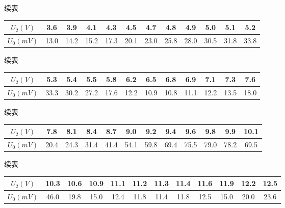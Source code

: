 \documentclass{article}
\begin{document}
    续表

    \begin{center}
        \begin{tabular}{|c|c|c|c|c|c|c|c|c|c|c|c|}
            \hline
            $U_2(V)$ & 3.6   & 3.9   & 4.1   & 4.3   & 4.5   & 4.7   & 4.8   & 4.9   & 5.0   & 5.1   & 5.2 \\
            \hline
            $U_0(mV)$ & 13.0  & 14.2  & 15.2  & 17.3  & 20.1  & 23.0  & 25.8  & 28.0  & 30.5  & 31.8  & 33.8 \\
            \hline
        \end{tabular}%
    \end{center}

    续表

    \begin{center}
        \begin{tabular}{|c|c|c|c|c|c|c|c|c|c|c|c|}
            \hline
            $U_2(V)$ & 5.3   & 5.4   & 5.5   & 5.8   & 6.2   & 6.5   & 6.8   & 6.9   & 7.1   & 7.3   & 7.6 \\
            \hline
            $U_0(mV)$ & 33.3  & 30.2  & 27.2  & 17.6  & 12.2  & 10.9  & 10.8  & 11.1  & 12.2  & 13.5  & 18.0 \\
            \hline
        \end{tabular}%
    \end{center}

    续表

    \begin{center}
        \begin{tabular}{|c|c|c|c|c|c|c|c|c|c|c|c|}
            \hline
            $U_2(V)$ & 7.8   & 8.1   & 8.4   & 8.7   & 9.0   & 9.2   & 9.4   & 9.6   & 9.8   & 9.9   & 10.1 \\
            \hline
            $U_0(mV)$ & 20.4  & 24.3  & 31.4  & 41.4  & 54.1  & 59.8  & 69.4  & 75.5  & 79.0  & 78.2  & 69.5 \\
            \hline
        \end{tabular}%
    \end{center}

    续表

    \begin{center}
        \begin{tabular}{|c|c|c|c|c|c|c|c|c|c|c|c|}
            \hline
            $U_2(V)$ & 10.3  & 10.6  & 10.9  & 11.1  & 11.2  & 11.3  & 11.4  & 11.6  & 11.9  & 12.2  & 12.5  \bigstrut\\
            \hline
            $U_0(mV)$ & 46.0  & 19.8  & 15.0  & 12.4  & 11.8  & 11.4  & 11.8  & 12.5  & 15.0  & 20.0  & 23.6  \bigstrut\\
            \hline
        \end{tabular}%
    \end{center}
\end{document}

